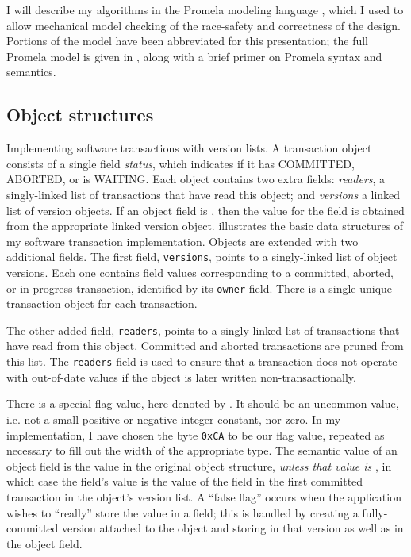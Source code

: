 I will describe my algorithms in the Promela modeling language
\cite{Holzmann03},
which I used to allow mechanical model checking of the race-safety
and correctness of the design.  Portions of the model have been
abbreviated for this presentation;  the full Promela model is
given in , along with a brief primer on Promela
syntax and semantics.

\subsection{Object structures}%
%
 {Implementing software transactions with version
  lists.  A transaction object consists of a single field {\it
    status}, which indicates if it has COMMITTED, ABORTED, or is WAITING.
  Each object contains two extra fields: {\it readers}, a
  singly-linked list of transactions that have read this object; and
  {\it versions} a linked list of version objects.  If an object field
  is \FLAG, then the value for the field is obtained from the
  appropriate linked version object.}
 illustrates the basic data structures of my
software transaction implementation.  Objects are extended with two
additional fields.  The first field, {\tt versions}, points to a
singly-linked list of object versions.  Each one contains field values
corresponding to a committed, aborted, or in-progress transaction,
identified by its {\tt owner} field.  There is a single unique
transaction object for each transaction.

The other added field, {\tt readers}, points to a singly-linked list
of transactions that have read from this object.  Committed and
aborted transactions are pruned from this list.  The {\tt readers}
field is used to ensure that a transaction does not operate with
out-of-date values if the object is later written
non-transactionally.

There is a special flag value, here denoted by \FLAG.  It should be
an uncommon value, i.e. not a small positive or negative integer
constant, nor zero.  In my implementation, I have chosen the byte
\texttt{0xCA} to be our flag value, repeated as necessary to fill out
the width of the appropriate type.
The semantic value of an object field is the value in the original
object structure, \emph{unless that value is \FLAG}, in which
case the field's value is the value of the field in the first
committed transaction in the object's version list.  A ``false flag''
occurs when the application wishes to ``really'' store the value \FLAG
in a field; this is handled by creating a fully-committed version
attached to the object and storing \FLAG in that version as well as in
the object field.

